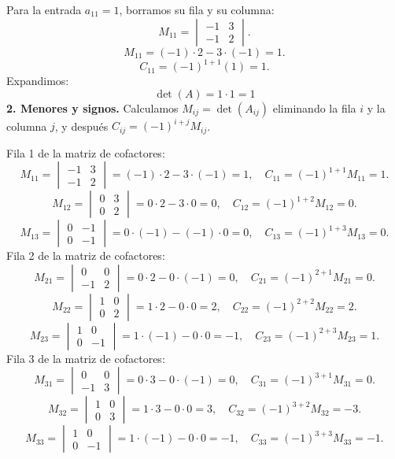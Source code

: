 \documentclass[12pt]{article}
\theoremstyle{remark}
\begin{document}
Para la entrada $a_{11}=1$, borramos su fila y su columna:
\[
M_{11}=\begin{vmatrix}-1&3\\-1&2\end{vmatrix}.
\]
\[
M_{11}=(-1)\cdot 2-3\cdot (-1)=1.
\]
\[
C_{11}=(-1)^{1+1}(1)=1.
\]
Expandimos: \[
\boxed{\det(A)=1\cdot 1=1}
\]
\textbf{2. Menores y signos.} Calculamos $M_{ij}=\det(A_{ij})$ eliminando la fila $i$ y la columna $j$, y después $C_{ij}=(-1)^{i+j}M_{ij}$.

Fila 1 de la matriz de cofactores:
\[
M_{11}=\begin{vmatrix}-1&3\\-1&2\end{vmatrix}=(-1)\cdot 2-3\cdot (-1)=1,\quad C_{11}=(-1)^{1+1}M_{11}=1.
\]
\[
M_{12}=\begin{vmatrix}0&3\\0&2\end{vmatrix}=0\cdot 2-3\cdot 0=0,\quad C_{12}=(-1)^{1+2}M_{12}=0.
\]
\[
M_{13}=\begin{vmatrix}0&-1\\0&-1\end{vmatrix}=0\cdot (-1)-(-1)\cdot 0=0,\quad C_{13}=(-1)^{1+3}M_{13}=0.
\]
Fila 2 de la matriz de cofactores:
\[
M_{21}=\begin{vmatrix}0&0\\-1&2\end{vmatrix}=0\cdot 2-0\cdot (-1)=0,\quad C_{21}=(-1)^{2+1}M_{21}=0.
\]
\[
M_{22}=\begin{vmatrix}1&0\\0&2\end{vmatrix}=1\cdot 2-0\cdot 0=2,\quad C_{22}=(-1)^{2+2}M_{22}=2.
\]
\[
M_{23}=\begin{vmatrix}1&0\\0&-1\end{vmatrix}=1\cdot (-1)-0\cdot 0=-1,\quad C_{23}=(-1)^{2+3}M_{23}=1.
\]
Fila 3 de la matriz de cofactores:
\[
M_{31}=\begin{vmatrix}0&0\\-1&3\end{vmatrix}=0\cdot 3-0\cdot (-1)=0,\quad C_{31}=(-1)^{3+1}M_{31}=0.
\]
\[
M_{32}=\begin{vmatrix}1&0\\0&3\end{vmatrix}=1\cdot 3-0\cdot 0=3,\quad C_{32}=(-1)^{3+2}M_{32}=-3.
\]
\[
M_{33}=\begin{vmatrix}1&0\\0&-1\end{vmatrix}=1\cdot (-1)-0\cdot 0=-1,\quad C_{33}=(-1)^{3+3}M_{33}=-1.
\]
\end{document}
